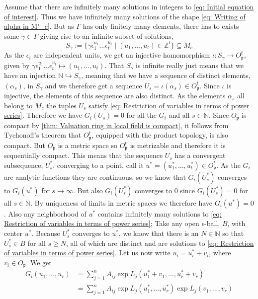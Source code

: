 \documentclass{article}
\newcommand{\mfrak}[1]{\mathfrak{#1}}
\newcommand{\mbb}[1]{\mathbb{#1}}
\numberwithin{equation}{section}
\begin{document}
Assume that there are infinitely many solutions in integers to \cref{eq: Initial equation of interest}. Thus we have infinitely many solutions of the shape \cref{eq: Writing of alpha in M'_c}. But as $\Gamma$ has only finitely many elements, there has to exists some $\gamma \in \Gamma$ giving rise to an infinite subset of solutions,
$$S_\gamma := \{\gamma \epsilon_1^{u_1} ... \epsilon_t^{u_t} \mid (u_1, ..., u_t) \in \mbb Z^t \} \subseteq M_c$$
As the $\epsilon_i$ are independent units, we get an injective homomorphism $\iota : S_\gamma \to O_\mfrak p^t$, given by $\gamma \epsilon_1^{u_1} ... \epsilon_t^{u_t} \mapsto (u_1, ..., u_t)$. That $S_\gamma$ is infinite really just means that we have an injection $\mbb N \hookrightarrow S_\gamma$, meaning that we have a sequence of distinct elements, $(\alpha_s)$, in $S_\gamma$ and we therefore get a sequence $U_s = \iota(\alpha_s) \in O_\mfrak p^t$. Since $\iota$ is injective, the elements of this sequence are also distinct. As the elements $\alpha_s$ all belong to $M_c$ the tuples $U_s$ satisfy \cref{eq: Restriction of variables in terms of power series}. Therefore we have $G_i(U_s) = 0$ for all the $G_i$ and all $s \in \mbb N$. Since $O_\mfrak p$ is compact by \cref{thm: Valuation ring in local field is compact}, it follows from Tychonoff's theorem that $O_\mfrak p^t$, equipped with the product topology, is also compact. But $O_\mfrak p$ is a metric space so $O_\mfrak p^t$ is metrizable and therefore it is sequentially compact. This means that the sequence $U_s$ has a convergent subsequence, $U^*_s$, converging to a point, call it $u^* = (u_1^*, ..., u_t^*) \in O_{\mfrak p}^t$. As the $G_i$ are analytic functions they are continuous, so we know that $G_i(U^*_s)$ converges to $G_i(u^*)$ for $s \to \infty$. But also $G_i(U^*_s)$ converges to 0 since $G_i(U^*_s) = 0$ for all $s \in \mbb N$. By uniqueness of limits in metric spaces we therefore have $G_i(u^*) = 0$. Also any neighborhood of $u^*$ contains infinitely many solutions to \cref{eq: Restriction of variables in terms of power series}; Take any open $\epsilon$-ball, $B$, with center $u^*$. Because $U^*_s$ converges to $u^*$, we know that there is an $N \in \mbb N$ so that $U^*_s \in B$ for all $s \geq N$, all of which are distinct and are solutions to \cref{eq: Restriction of variables in terms of power series}. Let us now write $u_i = u_i^* + v_i$, where $v_i \in O_\mfrak p$. We get
\begin{align*}
    G_i(u_1, ..., u_r) & = \sum_{j = 1}^n A_{ij} \exp L_j(u_1^* + v_1, ..., u_r^* + v_r)             \\
                       & = \sum_{j = 1}^n A_{ij} \exp L_j(u_1^*, ..., u_r^*) \exp L_j(v_1, ..., v_r)
\end{align*}
\end{document}
